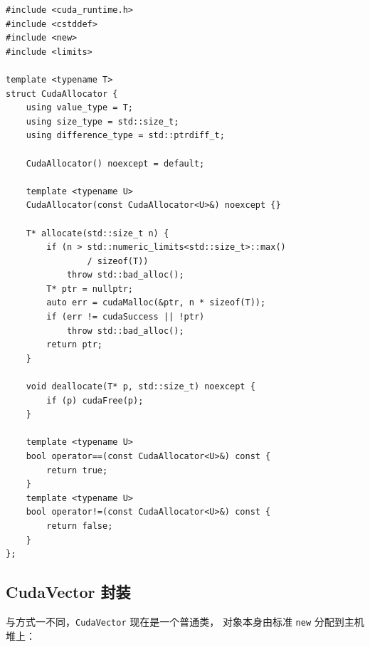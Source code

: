 \documentclass[12pt,a4paper,fontset=fandol]{ctexbook}
\begin{document}
\begin{lstlisting}
#include <cuda_runtime.h>
#include <cstddef>
#include <new>
#include <limits>

template <typename T>
struct CudaAllocator {
    using value_type = T;
    using size_type = std::size_t;
    using difference_type = std::ptrdiff_t;

    CudaAllocator() noexcept = default;

    template <typename U>
    CudaAllocator(const CudaAllocator<U>&) noexcept {}

    T* allocate(std::size_t n) {
        if (n > std::numeric_limits<std::size_t>::max()
                / sizeof(T))
            throw std::bad_alloc();
        T* ptr = nullptr;
        auto err = cudaMalloc(&ptr, n * sizeof(T));
        if (err != cudaSuccess || !ptr)
            throw std::bad_alloc();
        return ptr;
    }

    void deallocate(T* p, std::size_t) noexcept {
        if (p) cudaFree(p);
    }

    template <typename U>
    bool operator==(const CudaAllocator<U>&) const {
        return true;
    }
    template <typename U>
    bool operator!=(const CudaAllocator<U>&) const {
        return false;
    }
};
\end{lstlisting}

\subsection{CudaVector 封装}

与方式一不同，\texttt{CudaVector} 现在是一个普通类，
对象本身由标准 \texttt{new} 分配到主机堆上：
\end{document}
